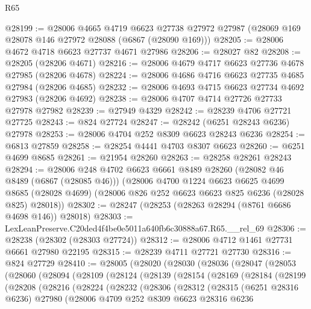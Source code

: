 \begin{lexlean}{R65}
\begin{coremodule}
{@28199 := @28006
    @4665
    @4719
    @6623
    @27738
    @27972
    @27987
    (@28069 @169 @28078 @146 @27972 @28088 (@6867 (@28090 @169)))
@28205 := @28006 @4672 @4718 @6623 @27737 @4671 @27986
@28206 := @28027 @82
@28208 := @28205 (@28206 @4671)
@28216 := @28006 @4679 @4717 @6623 @27736 @4678 @27985 (@28206 @4678)
@28224 := @28006 @4686 @4716 @6623 @27735 @4685 @27984 (@28206 @4685)
@28232 := @28006 @4693 @4715 @6623 @27734 @4692 @27983 (@28206 @4692)
@28238 := @28006 @4707 @4714 @27726 @27733 @27978 @27982
@28239 := @27949 @4329
@28242 := @28239 @4706 @27721 @27725
@28243 := @824 @27724
@28247 := @28242 (@6251 @28243 @6236) @27978
@28253 := @28006 @4704 @252 @8309 @6623 @28243 @6236
@28254 := @6813 @27859
@28258 := @28254 @4441 @4703 @8307 @6623
@28260 := @6251 @4699 @8685
@28261 := @21954 @28260
@28263 := @28258 @28261 @28243
@28294 := @28006
    @248
    @4702
    @6623
    @6661
    @8489
    @28260
    (@28082 @46 @8489 (@6867 (@28085 @46)))
    (@28006
      @4700
      @1224
      @6623
      @6625
      @4699
      @8685
      (@28028 @4699)
      (@28006 @826 @252 @6623 @6623 @825 @6236 (@28028 @825) @28018))
@28302 := @28247 (@28253 (@28263 @28294 (@8761 @6686 @4698 @146)) @28018)
@28303 := LexLeanPreserve.C20ded4f4be0e5011a640fb6c30888a67.R65.__rel_69
@28306 := @28238 (@28302 (@28303 @27724))
@28312 := @28006 @4712 @1461 @27731 @6661 @27980 @22195
@28315 := @28239 @4711 @27721 @27730
@28316 := @824 @27729
@28410 := @28005
    (@28020
      (@28030
        (@28036
          (@28047
            (@28053
              (@28060
                (@28094
                  (@28109
                    (@28124
                      (@28139
                        (@28154
                          (@28169
                            (@28184
                              (@28199
                                (@28208
                                  (@28216
                                    (@28224
                                      (@28232
                                        (@28306
                                          (@28312
                                            (@28315
                                              (@6251 @28316 @6236)
                                              @27980
                                              (@28006
                                                @4709
                                                @252
                                                @8309
                                                @6623
                                                @28316
                                                @6236
}
\end{coremodule}
\end{lexlean}
